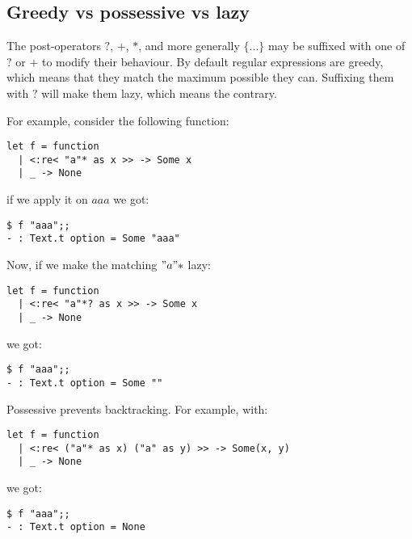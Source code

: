 \documentclass{article}
\begin{document}
\subsection{Greedy vs possessive vs lazy}

The post-operators $?$, $+$, $*$, and more generally $\{...\}$ may be
suffixed with one of $?$ or $+$ to modify their behaviour. By default
regular expressions are greedy, which means that they match the
maximum possible they can. Suffixing them with $?$ will make them
lazy, which means the contrary.

For example, consider the following function:

\lstset{language=[Objective]Caml}\begin{lstlisting}
let f = function
  | <:re< "a"* as x >> -> Some x
  | _ -> None
\end{lstlisting}

if we apply it on $aaa$ we got:

\lstset{language=[Objective]Caml}\begin{lstlisting}
$ f "aaa";;
- : Text.t option = Some "aaa"
\end{lstlisting}

Now, if we make the matching $"a"*$ lazy:

\lstset{language=[Objective]Caml}\begin{lstlisting}
let f = function
  | <:re< "a"*? as x >> -> Some x
  | _ -> None
\end{lstlisting}

we got:

\lstset{language=[Objective]Caml}\begin{lstlisting}
$ f "aaa";;
- : Text.t option = Some ""
\end{lstlisting}

Possessive prevents backtracking. For example, with:

\lstset{language=[Objective]Caml}\begin{lstlisting}
let f = function
  | <:re< ("a"* as x) ("a" as y) >> -> Some(x, y)
  | _ -> None
\end{lstlisting}

we got:

\lstset{language=[Objective]Caml}\begin{lstlisting}
$ f "aaa";;
- : Text.t option = None
\end{lstlisting}
\end{document}
